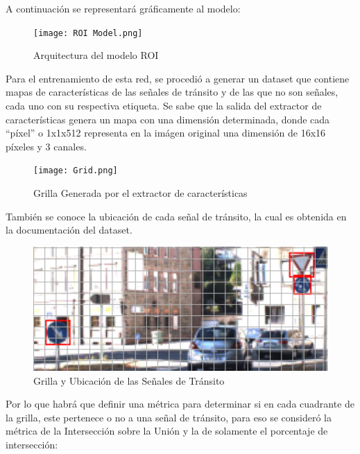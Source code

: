     A continuación se representará gráficamente al modelo:
    
    \vspace{0.5cm}

    \begin{figure}[ht]
        \centering
        \texttt{[image: ROI Model.png]}
        \caption{Arquitectura del modelo ROI}
    \end{figure}

    \vspace{0.2cm}

    Para el entrenamiento de esta red, se procedió a generar un dataset que contiene mapas de características de las señales de tránsito y de las que no son señales, cada uno con su respectiva etiqueta.
    Se sabe que la salida del extractor de características genera un mapa con una dimensión determinada, donde cada ``píxel'' o 1x1x512 representa en la imágen original una dimensión de 16x16 píxeles y 3 canales.

    \pagebreak
    
    \begin{figure}[ht]
        \centering
        \texttt{[image: Grid.png]}
        \caption{Grilla Generada por el extractor de características}
    \end{figure}

    También se conoce la ubicación de cada señal de tránsito, la cual es obtenida en la documentación del dataset.

    \begin{figure}[ht]
        \centering
        \includegraphics[scale=.8]{img/Grid_label.png}
        \caption{Grilla y Ubicación de las Señales de Tránsito}
    \end{figure}

    Por lo que habrá que definir una métrica para determinar si en cada cuadrante de la grilla, este pertenece o no a una señal de tránsito, para eso se consideró la métrica de la Intersección sobre la Unión y la de solamente el porcentaje de intersección:
    
